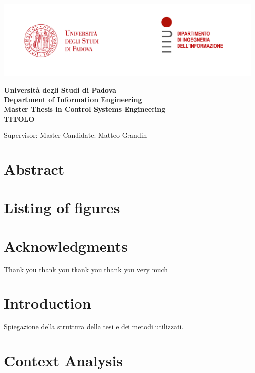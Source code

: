 \documentclass[a4paper,12pt,sort&compress]{article}
\begin{document}
\begin{titlepage}
    \centering
    \includegraphics[width=\linewidth]{loghi.png} %
    {\bfseries\Large
       Università degli Studi di Padova \\
       Department of Information Engineering\\
        Master Thesis in Control Systems Engineering\\
        \vskip2cm
        TITOLO\\
        \vskip2cm
        \raggedright
        Supervisor:
        \vskip2cm
        \raggedleft
        Master Candidate: Matteo Grandin
    }    
    \vfill

\end{titlepage}


\section{Abstract}
    
    \newpage

\tableofcontents
\newpage

\section{Listing of figures}

    \newpage


\section{Acknowledgments}

    Thank you thank you thank you thank you very much
    \newpage


\section{Introduction}

    Spiegazione della struttura della tesi e dei metodi utilizzati.
    \newpage


\section{Context Analysis}
\end{document}

